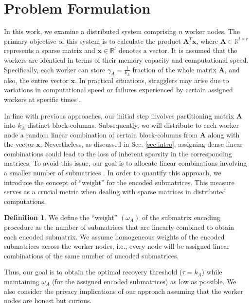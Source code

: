 \documentclass[conference]{IEEEtran}
\theoremstyle{definition}
\newtheorem{definition}{Definition}
\newcommand{\bfA}{\mathbf{A}}
\newcommand{\bfx}{\mathbf{x}}
\begin{document}
\section{Problem Formulation}
\label{sec:probform}
In this work, we examine a distributed system comprising $n$ worker nodes. The primary objective of this system is to calculate the product $\bfA^T \bfx$, where $\bfA \in \mathbb{R}^{t \times r}$ represents a sparse matrix and $\bfx \in \mathbb{R}^{t}$ denotes a vector. It is assumed that the workers are identical in terms of their memory capacity and computational speed. Specifically, each worker can store $\gamma_A = \frac{1}{k_A}$ fraction of the whole matrix $\bfA$, and also, the entire vector $\bfx$. In practical situations, stragglers may arise due to variations in computational speed or failures experienced by certain assigned workers at specific times \cite{das2019random}.

In line with previous approaches, our initial step involves partitioning matrix $\bfA$ into $k_A$ distinct block-columns. Subsequently, we will distribute to each worker node a random linear combination of certain block-columns from $\bfA$ along with the vector $\bfx$. Nevertheless, as discussed in Sec. \ref{sec:intro}, assigning dense linear combinations could lead to the loss of inherent sparsity in the corresponding matrices. To avoid this issue, our goal is to allocate linear combinations involving a smaller number of submatrices \cite{dasunifiedtreatment, das2023distributedisit}. In order to quantify this approach, we introduce the concept of ``weight'' for the encoded submatrices. This measure serves as a crucial metric when dealing with sparse matrices in distributed computations.

\begin{definition}
\label{def:weight}
We define the ``weight'' $(\omega_A)$ of the submatrix encoding procedure as the number of submatrices that are linearly combined to obtain each encoded submatrix. We assume homogeneous weights of the encoded submatrices across the worker nodes, i.e., every node will be assigned linear combinations of the same number of uncoded submatrices.
\end{definition}

Thus, our goal is to obtain the optimal recovery threshold ($\tau = k_A$) while maintaining $\omega_A$ (for the assigned encoded submatrices) as low as possible. We also consider the privacy implications of our approach assuming that the worker nodes are honest but curious.
\end{document}
